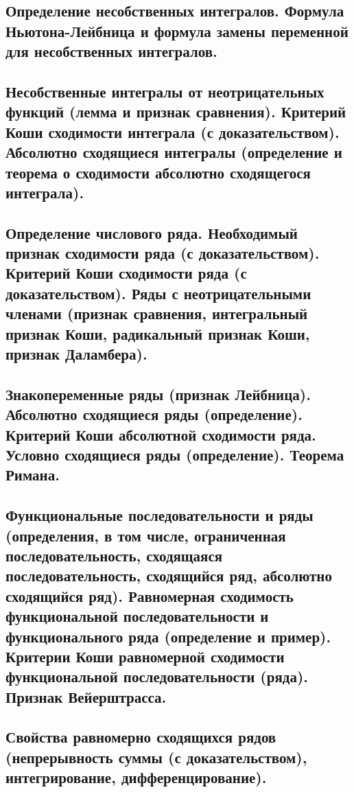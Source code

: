 \documentclass[11pt]{article}
\begin{document}
\subsection{Определение несобственных интегралов.  Формула Ньютона-Лейбница и формула замены переменной для несобственных интегралов.}
\label{sec:org1847530}

\subsection{Несобственные интегралы от неотрицательных функций (лемма и признак сравнения). Критерий Коши сходимости интеграла (с доказательством). Абсолютно сходящиеся интегралы (определение и теорема о сходимости абсолютно сходящегося интеграла).}
\label{sec:org8c7aaa1}

\subsection{Определение числового ряда. Необходимый признак сходимости ряда (с доказательством). Критерий Коши сходимости ряда (с доказательством). Ряды с неотрицательными членами (признак сравнения, интегральный признак Коши, радикальный признак Коши, признак Даламбера).}
\label{sec:orgd68cc6a}

\subsection{Знакопеременные ряды (признак Лейбница). Абсолютно сходящиеся ряды (определение). Критерий Коши абсолютной сходимости ряда. Условно сходящиеся ряды (определение). Теорема Римана.}
\label{sec:orge980191}

\subsection{Функциональные последовательности  и ряды (определения, в том числе, ограниченная последовательность, сходящаяся последовательность, сходящийся ряд, абсолютно сходящийся ряд). Равномерная сходимость функциональной последовательности и функционального ряда (определение и пример). Критерии Коши равномерной сходимости функциональной последовательности (ряда). Признак Вейерштрасса.}
\label{sec:org2e80d7b}

\subsection{Свойства равномерно сходящихся рядов (непрерывность суммы (с доказательством), интегрирование, дифференцирование).}
\label{sec:orga11db55}
\end{document}
